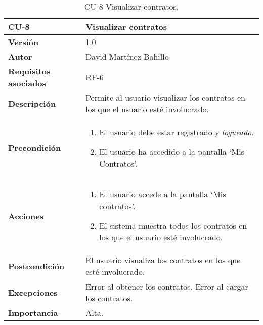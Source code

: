 \begin{table}[p]
	\centering
	\begin{tabularx}{\linewidth}{ p{} p{} }
		\toprule
		\textbf{CU-8}    & \textbf{Visualizar contratos}\\
		\midrule
		\textbf{Versión}              & 1.0    \\
		\textbf{Autor}                & David Martínez Bahillo \\
		\textbf{Requisitos asociados} & RF-6 \\
		\textbf{Descripción}          & Permite al usuario visualizar los contratos en los que el usuario esté involucrado. \\
		\textbf{Precondición}         &  
		\begin{enumerate}
			\def\labelenumi{\arabic{enumi}.}
			\tightlist
			\item El usuario debe estar registrado y \textit{logueado}.
			\item El usuario ha accedido a la pantalla `Mis Contratos'.
		\end{enumerate}\\
		\textbf{Acciones}             &
		\begin{enumerate}
			\def\labelenumi{\arabic{enumi}.}
			\tightlist
			\item El usuario accede a la pantalla `Mis contratos'.
			\item El sistema muestra todos los contratos en los que el usuario esté involucrado.
		\end{enumerate}\\
		\textbf{Postcondición}        & El usuario visualiza los contratos en los que esté involucrado. \\
		\textbf{Excepciones}          & Error al obtener los contratos. Error al cargar los contratos. \\
		\textbf{Importancia}          & Alta. \\
		\bottomrule
	\end{tabularx}
	\caption{CU-8 Visualizar contratos.}
\end{table}


